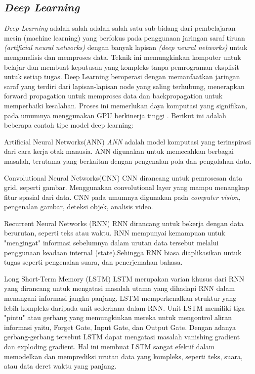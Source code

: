 \subsection{\textit{Deep Learning}}
\textit{Deep Learning} adalah salah adalah salah satu sub-bidang dari pembelajaran mesin (machine learning) yang berfokus pada penggunaan jaringan saraf tiruan \textit{(artificial neural networks)} dengan banyak lapisan \textit{(deep neural networks)} untuk menganalisis dan memproses data. Teknik ini memungkinkan komputer untuk belajar dan membuat keputusan yang kompleks tanpa pemrograman eksplisit untuk setiap tugas\cite{amazonDeepLearning}. Deep Learning beroperasi dengan memanfaatkan jaringan saraf yang terdiri dari lapisan-lapisan node yang saling terhubung, menerapkan forward propagation untuk memproses data dan backpropagation untuk memperbaiki kesalahan. Proses ini memerlukan daya komputasi yang signifikan, pada umumnya menggunakan GPU berkinerja tinggi \cite{ibmWhatDeep}. Berikut ini adalah beberapa contoh tipe model deep learning:
\begin{packed_item}
	\item Artificial Neural Networks(ANN)
	 \textit{ANN} adalah model komputasi yang terinspirasi dari cara kerja otak manusia. ANN digunakan untuk memecahkan berbagai masalah, terutama yang berkaitan dengan pengenalan pola dan pengolahan data. 
	\item Convolutional Neural Networks(CNN)
	CNN dirancang untuk pemrosesan data grid, seperti gambar. Menggunakan convolutional layer yang mampu menangkap fitur spasial dari data. CNN pada umumnya digunakan pada \textit{computer vision}, pengenalan gambar, deteksi objek, analisis video. 
	\item Recurrent Neural Networks (RNN)
	RNN dirancang untuk bekerja dengan data berurutan, seperti teks atau waktu. RNN mempunyai kemampuan untuk "mengingat" informasi sebelumnya  dalam urutan data tersebut melalui penggunaan keadaan internal (state).Sehingga RNN biasa diaplikasikan untuk tugas seperti pengenalan suara, dan penerjemahan bahasa. 
	\item Long Short-Term Memory (LSTM)
	LSTM merupakan varian khusus dari RNN yang dirancang untuk mengatasi masalah utama yang dihadapi RNN dalam menangani informasi jangka panjang. LSTM memperkenalkan struktur yang lebih kompleks daripada unit sederhana dalam RNN. Unit LSTM memiliki tiga "pintu" atau gerbang yang memungkinkan mereka untuk mengontrol aliran informasi yaitu, Forget Gate, Input Gate, dan Output Gate. Dengan adanya gerbang-gerbang tersebut  LSTM dapat mengatasi masalah vanishing gradient dan exploding gradient.  Hal ini membuat LSTM sangat efektif dalam memodelkan dan memprediksi urutan data yang kompleks, seperti teks, suara, atau data deret waktu yang panjang.
\end{packed_item}


